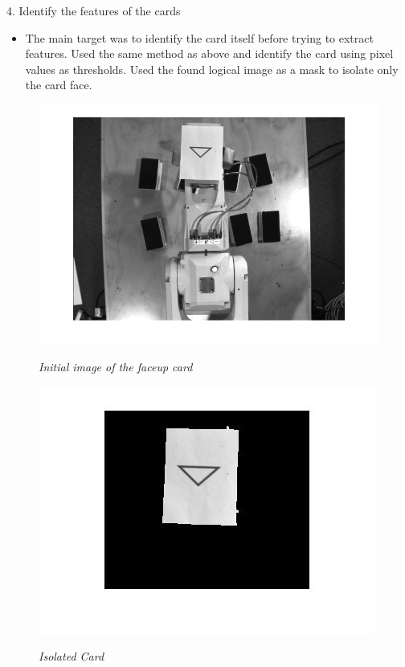 4.	Identify the features of the cards
\begin{itemize}
	\item The main target was to identify the card itself before trying to extract features. Used the same method as above and identify the card using pixel values as thresholds. Used the found logical image as a mask to isolate only the card face.

\end{itemize}
\begin{figure}[position = here]
	\begin{centering}
		\includegraphics[scale=0.3]{./sachiths_images/image5.png}\\
		\caption[]{\textit{Initial image of the faceup card\label{imFup1}}}
	\end{centering}
\end{figure}
\begin{figure}[position = here]
	\begin{centering}
		\includegraphics[scale=0.5]{./sachiths_images/image6.png}\\
		\caption[]{\textit{Isolated Card\label{isol1}}}
	\end{centering}
\end{figure}

